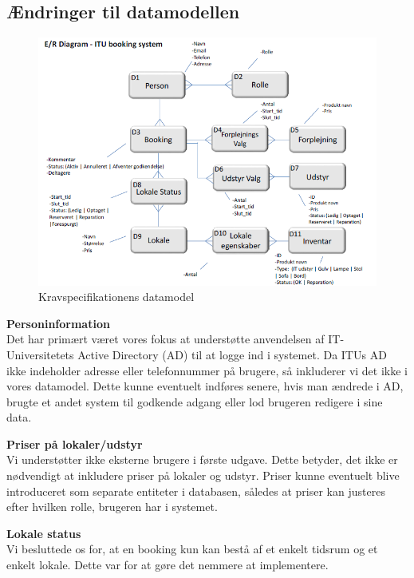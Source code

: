\subsection*{Ændringer til datamodellen}
\label{Technical_Database_changes}
\begin{figure}[h!]
  \centering
    \includegraphics[width=\textwidth]{Chapters/Design/Technical/Images/KSdata}
  \caption{Kravspecifikationens datamodel}
\label{Fig:Technical_Database_changes_KSdata}
\end{figure}

\textbf{Personinformation}
\\Det har primært været vores fokus at understøtte anvendelsen af IT-Universitetets Active Directory (AD) til at logge ind i systemet. Da ITUs AD ikke indeholder adresse eller telefonnummer på brugere, så inkluderer vi det ikke i vores datamodel. Dette kunne eventuelt indføres senere, hvis man ændrede i AD, brugte et andet system til godkende adgang eller lod brugeren redigere i sine data.

\textbf{Priser på lokaler/udstyr}
\\Vi understøtter ikke eksterne brugere i første udgave. Dette betyder, det ikke er nødvendigt at inkludere priser på lokaler og udstyr. Priser kunne eventuelt blive introduceret som separate entiteter i databasen, således at priser kan justeres efter hvilken rolle, brugeren har i systemet.

\textbf{Lokale status}
\\Vi besluttede os for, at en booking kun kan bestå af et enkelt tidsrum og et enkelt lokale. Dette var for at gøre det nemmere at implementere.

